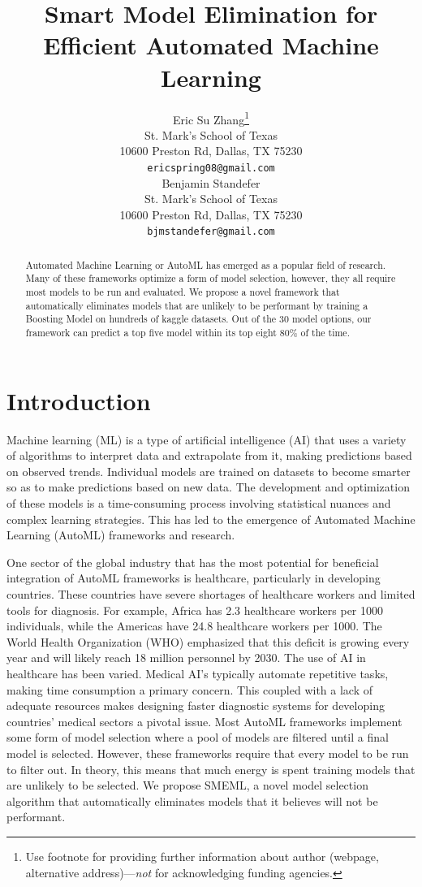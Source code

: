 \documentclass{article}
\title{Smart Model Elimination for Efficient Automated Machine Learning}
\author{%
  Eric Su Zhang\thanks{Use footnote for providing further information
    about author (webpage, alternative address)---\emph{not} for acknowledging
    funding agencies.} \\
  St. Mark's School of Texas\\
  10600 Preston Rd, Dallas, TX 75230\\
  \texttt{ericspring08@gmail.com} \\
  \And
  Benjamin Standefer \\
  St. Mark's School of Texas \\
  10600 Preston Rd, Dallas, TX 75230 \\
  \texttt{bjmstandefer@gmail.com} \\
}
\begin{document}
\maketitle


\begin{abstract}
  Automated Machine Learning or AutoML has emerged as a popular field of research. Many of these frameworks optimize a form of model selection, however, they all require most models to be run and evaluated. We propose a novel framework that automatically eliminates models that are unlikely to be performant by training a Boosting Model on hundreds of kaggle datasets. Out of the 30 model options, our framework can predict a top five model within its top eight 80\% of the time.
\end{abstract}


\section{Introduction}

Machine learning (ML) is a type of artificial intelligence (AI) that uses a variety of algorithms to interpret data and extrapolate from it, making predictions based on observed trends. Individual models are trained on datasets to become smarter so as to make predictions based on new data. The development and optimization of these models is a time-consuming process involving statistical nuances and complex learning strategies. This has led to the emergence of Automated Machine Learning (AutoML) frameworks and research. 

One sector of the global industry that has the most potential for beneficial integration of AutoML frameworks is healthcare, particularly in developing countries. These countries have severe shortages of healthcare workers and limited tools for diagnosis. For example, Africa has 2.3 healthcare workers per 1000 individuals, while the Americas have 24.8 healthcare workers per 1000. The World Health Organization (WHO) emphasized that this deficit is growing every year and will likely reach 18 million personnel by 2030. The use of AI in healthcare has been varied. Medical AI's typically automate repetitive tasks, making time consumption a primary concern. This coupled with a lack of adequate resources makes designing faster diagnostic systems for developing countries' medical sectors a pivotal issue. 
%
Most AutoML frameworks implement some form of model selection where a pool of models are filtered until a final model is selected. However, these frameworks require that every model to be run to filter out. In theory, this means that much energy is spent training models that are unlikely to be selected. We propose SMEML, a novel model selection algorithm that automatically eliminates models that it believes will not be performant. 
\end{document}
